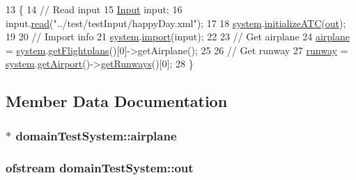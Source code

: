 \begin{DoxyCode}
13                          \{
14         \textcolor{comment}{// Read input}
15         \hyperlink{classInput}{Input} input;
16         input.\hyperlink{classInput_abb78078475f91c654db63c392aefbf51}{read}(\textcolor{stringliteral}{"../test/testInput/happyDay.xml"});
17 
18         \hyperlink{classdomainTestSystem_a56da545e95cc6b6606ec94857adc14eb}{system}.\hyperlink{classSystem_a5e9a3f6b8d3d5cb99c041bfcaace9683}{initializeATC}(\hyperlink{classdomainTestSystem_a63655622f1037160f95d7466a594859d}{out});
19 
20         \textcolor{comment}{// Import info}
21         \hyperlink{classdomainTestSystem_a56da545e95cc6b6606ec94857adc14eb}{system}.\hyperlink{classSystem_ad1f1022247d9556d0ce4061bb68572cc}{import}(input);
22 
23         \textcolor{comment}{// Get airplane}
24         \hyperlink{classdomainTestSystem_a835a6facfcfab2d120dae14195d3ed96}{airplane} = \hyperlink{classdomainTestSystem_a56da545e95cc6b6606ec94857adc14eb}{system}.\hyperlink{classSystem_a14a06028897516eb4df651220e70ce8f}{getFlightplans}()[0]->getAirplane();
25 
26         \textcolor{comment}{// Get runway}
27         \hyperlink{classdomainTestSystem_aff348e2b0204535147979a4af0f1953d}{runway} = \hyperlink{classdomainTestSystem_a56da545e95cc6b6606ec94857adc14eb}{system}.\hyperlink{classSystem_a8cd2a9b13cdbcf30f801e46cf8284800}{getAirport}()->\hyperlink{classAirport_a14310ffeba8a024105071c156fd42cf7}{getRunways}()[0];
28     \}
\end{DoxyCode}


\subsection{Member Data Documentation}
\subsubsection[{\texorpdfstring{airplane}{airplane}}]{$\ast$ domain\+Test\+System\+::airplane\hspace{0.3cm}{\ttfamily [protected]}}\hypertarget{classdomainTestSystem_a835a6facfcfab2d120dae14195d3ed96}{}\label{classdomainTestSystem_a835a6facfcfab2d120dae14195d3ed96}
\subsubsection[{\texorpdfstring{out}{out}}]{\setlength{\rightskip}{0pt plus 5cm}ofstream domain\+Test\+System\+::out\hspace{0.3cm}{\ttfamily [protected]}}\hypertarget{classdomainTestSystem_a63655622f1037160f95d7466a594859d}{}\label{classdomainTestSystem_a63655622f1037160f95d7466a594859d}
